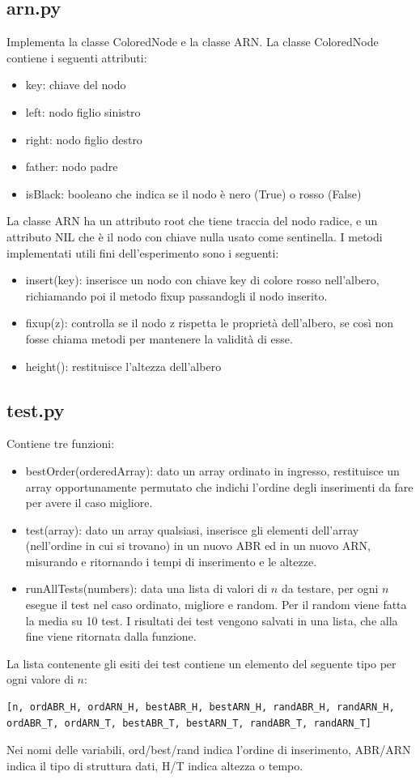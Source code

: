 \documentclass[]{article}
\begin{document}
\subsection*{arn.py}
Implementa la classe ColoredNode e la classe ARN.
La classe ColoredNode contiene i seguenti attributi:
\begin{itemize}
\item key: chiave del nodo
\item left: nodo figlio sinistro
\item right: nodo figlio destro
\item father: nodo padre
\item isBlack: booleano che indica se il nodo è nero (True) o rosso (False)
\end{itemize}
La classe ARN ha un attributo root che tiene traccia del nodo radice, e un attributo NIL che è il nodo con chiave nulla usato come sentinella. I metodi implementati utili fini dell'esperimento sono i seguenti:
\begin{itemize}
\item insert(key): inserisce un nodo con chiave key di colore rosso nell'albero, richiamando poi il metodo fixup passandogli il nodo inserito.
\item fixup(z): controlla se il nodo z rispetta le proprietà dell'albero, se così non fosse chiama metodi per mantenere la validità di esse.
\item height(): restituisce l'altezza dell'albero
\end{itemize}

\subsection*{test.py}
Contiene tre funzioni:
\begin{itemize}
\item bestOrder(orderedArray): dato un array ordinato in ingresso, restituisce un array opportunamente permutato che indichi l'ordine degli inserimenti da fare per avere il caso migliore.
\item test(array): dato un array qualsiasi, inserisce gli elementi dell'array (nell'ordine in cui si trovano) in un nuovo ABR ed in un nuovo ARN, misurando e ritornando i tempi di inserimento e le altezze.
\item runAllTests(numbers): data una lista di valori di $n$ da testare, per ogni $n$ esegue il test nel caso ordinato, migliore e random. Per il random viene fatta la media su 10 test. I risultati dei test vengono salvati in una lista, che alla fine viene ritornata dalla funzione.
\end{itemize}
La lista contenente gli esiti dei test contiene un elemento del seguente tipo per ogni valore di $n$:
\begin{verbatim}
[n, ordABR_H, ordARN_H, bestABR_H, bestARN_H, randABR_H, randARN_H,
ordABR_T, ordARN_T, bestABR_T, bestARN_T, randABR_T, randARN_T]
\end{verbatim}
Nei nomi delle variabili, ord/best/rand indica l'ordine di inserimento, ABR/ARN indica il tipo di struttura dati, H/T indica altezza o tempo.
\end{document}
